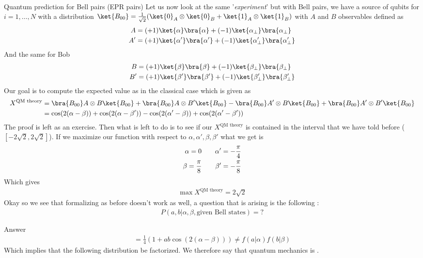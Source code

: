 \begin{parag}{Quantum prediction for Bell pairs (EPR pairs)}
    Let us now look at the same '\textit{experiment}' but with Bell pairs, we have a source of qubits for $i = 1, \ldots, N$ with a distribution $\ket{B_{00}}= \frac{1}{\sqrt{2}}\left(\ket{0}_A \otimes \ket{0}_B + \ket{1}_A \otimes \ket{1}_B\right)$ with $A$ and $B$ observables defined as 
	\begin{align*} 
		A &=  \left(+1\right) \ket{\alpha}\bra{\alpha} + \left(-1\right) \ket{\alpha_\perp}\bra{\alpha_\perp}\\
		A'&= \left(+1\right)\ket{\alpha'}\bra{\alpha'} + \left(-1\right) \ket{\alpha_\perp'}\bra{\alpha_\perp'}
	\end{align*}
	And the same for Bob 
	\begin{align*} 
		B &=  \left(+1\right) \ket{\beta}\bra{\beta} + \left(-1\right) \ket{\beta_\perp}\bra{\beta_\perp}\\
		B'&= \left(+1\right)\ket{\beta'}\bra{\beta'} + \left(-1\right) \ket{\beta_\perp'}\bra{\beta_\perp'}
	\end{align*}
	Our goal is to compute the expected value as in the classical case which is given as 
	\begin{align*} 
		X^{\text{QM theory}}  &= \bra{B_{00}}A \otimes B \ket{B_{00}} + \bra{B_{00} }A \otimes B'\ket{B_{00}} - \bra{B_{00}} A' \otimes B \ket{B_{00}} + \bra{B_{00}} A' \otimes B' \ket{B_{00}}\\
		&= \cos\left(2\left(\alpha - \beta\right)\right) + \cos \left(2\left(\alpha - \beta'\right)\right) - \cos \left(2 \left(\alpha' - \beta\right)\right) + \cos \left(2\left(\alpha' - \beta'\right)\right)
	\end{align*}
	The proof is left as an exercise. Then what is left to do is to see if our $X^{\text{QM theory}}$ is contained in the interval that we have told before ($\left[- 2 \sqrt{2}, 2 \sqrt{2}\right]$). If we maximize our function with respect to $\alpha, \alpha', \beta, \beta'$ what we get is 
	\begin{align*} 
		\alpha = 0 \quad \quad \alpha' =  - \frac{\pi}{4} \\
		\beta = \frac{\pi}{8} \quad\quad \beta' = - \frac{\pi}{8}
	\end{align*}
	Which gives 
	\begin{align*} 
		\max X^{\text{QM theory}} =  2\sqrt{2} 
	\end{align*}
	Okay so we see that formalizing as before doesn't work as well, a question that is arising is the following :
	\begin{align*} 
		P\left(a, b| \alpha, \beta, \text{given Bell states}\right) = ?
	\end{align*}
	\begin{subparag}{Answer}
	    \begin{align*} 
	    	= \frac{1}{4}\left(1 + ab \cos\left(2\left(\alpha - \beta\right)\right)\right)  \neq f\left(a | \alpha\right) f\left(b | \beta\right)
	    \end{align*}
		Which implies that the following distribution  be factorized. We therefore say that quantum mechanics is .
	\end{subparag}
\end{parag}

